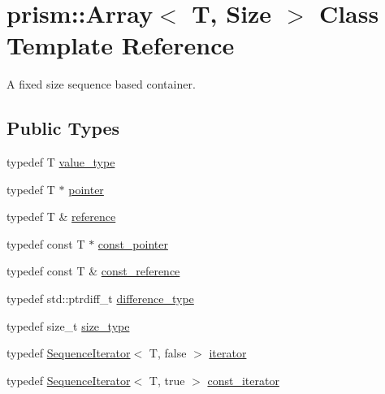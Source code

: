 \hypertarget{classprism_1_1_array}{}\section{prism\+:\+:Array$<$ T, Size $>$ Class Template Reference}
\label{classprism_1_1_array}


A fixed size sequence based container.  


\subsection*{Public Types}
\begin{DoxyCompactItemize}
\item 
typedef T \hyperlink{classprism_1_1_array_a903dc381b1e02970d00be6002dc15d3e}{value\+\_\+type}
\item 
typedef T $\ast$ \hyperlink{classprism_1_1_array_a06cca3e8ac92f77d0068246d715bb0e4}{pointer}
\item 
typedef T \& \hyperlink{classprism_1_1_array_a00d78e61fb0a47489aff55b88ae9ebaa}{reference}
\item 
typedef const T $\ast$ \hyperlink{classprism_1_1_array_a5aa9af8079a0a39654775076cc9d16e2}{const\+\_\+pointer}
\item 
typedef const T \& \hyperlink{classprism_1_1_array_a16161ca6c0027dfa1a7c678e820eedc3}{const\+\_\+reference}
\item 
typedef std\+::ptrdiff\+\_\+t \hyperlink{classprism_1_1_array_a0b64c4713d73faa944ecd7b0e3f648a8}{difference\+\_\+type}
\item 
typedef size\+\_\+t \hyperlink{classprism_1_1_array_a91c89205e41d0e7825562343bfde3f1b}{size\+\_\+type}
\item 
typedef \hyperlink{structprism_1_1_sequence_iterator}{Sequence\+Iterator}$<$ T, false $>$ \hyperlink{classprism_1_1_array_a097ed322849188b1c8a8697405160638}{iterator}
\item 
typedef \hyperlink{structprism_1_1_sequence_iterator}{Sequence\+Iterator}$<$ T, true $>$ \hyperlink{classprism_1_1_array_a187e11a8ec836c0b69b96b51fba73164}{const\+\_\+iterator}
\end{DoxyCompactItemize}
